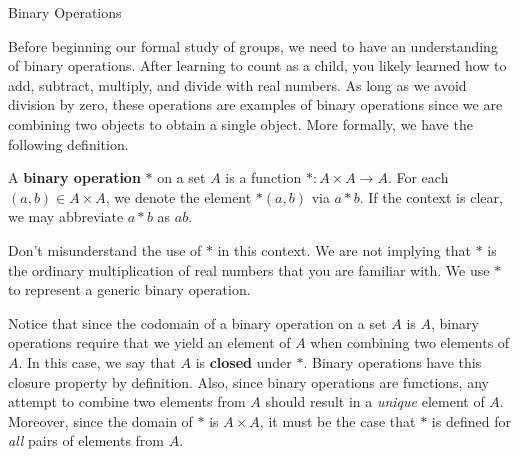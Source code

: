 \begin{section}{Binary Operations}


Before beginning our formal study of groups, we need to have an understanding of binary operations. After learning to count as a child, you likely learned how to add, subtract, multiply, and divide with real numbers.  As long as we avoid division by zero, these operations are examples of binary operations since we are combining two objects to obtain a single object.  More formally, we have the following definition.

\begin{definition}
A \textbf{binary operation} $*$ on a set $A$ is a function $*:A\times A\to A$.  For each $(a,b)\in A\times A$, we denote the element $*(a,b)$ via $a*b$.  If the context is clear, we may abbreviate $a*b$ as $ab$.
\end{definition}

Don't misunderstand the use of $*$ in this context.  We are not implying that $*$ is the ordinary multiplication of real numbers that you are familiar with.  We use $*$ to represent a generic binary operation.  

Notice that since the codomain of a binary operation on a set $A$ is $A$, binary operations require that we yield an element of $A$ when combining two elements of $A$.  In this case, we say that $A$ is \textbf{closed} under $*$.  Binary operations have this closure property by definition.  Also, since binary operations are functions, any attempt to combine two elements from $A$ should result in a \emph{unique} element of $A$.  Moreover, since the domain of $*$ is $A\times A$, it must be the case that $*$ is defined for \emph{all} pairs of elements from $A$.


\end{section}
